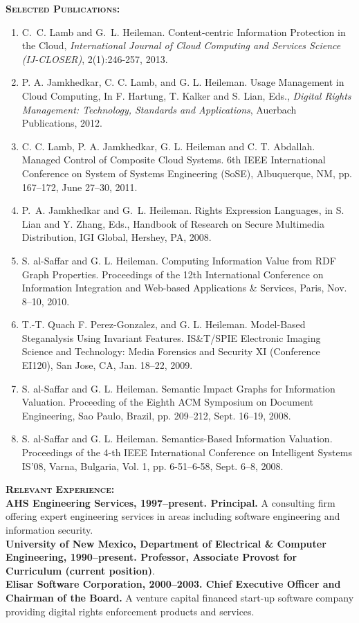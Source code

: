 \documentclass{sbir}
\begin{document}
{{\vspace{-16pt}
\textbf{\textsc{Selected Publications:}}
\vspace{-8pt}
\begin{enumerate}
\item C.~C. Lamb and G.~L. Heileman. Content-centric Information Protection in the Cloud, {\sl International Journal of Cloud Computing and Services Science  (IJ-CLOSER)}, 2(1):246-257, 2013.
\item P. A. Jamkhedkar, C. C. Lamb, and G. L. Heileman. Usage Management in Cloud Computing, In F. Hartung, T. Kalker and S. Lian, Eds., {\sl Digital Rights Management: Technology, Standards and Applications}, Auerbach Publications, 2012. 
\item C. C. Lamb, P. A. Jamkhedkar, G. L. Heileman and C. T. Abdallah. Managed Control of Composite Cloud Systems. 6th IEEE International Conference on System of Systems Engineering (SoSE), Albuquerque, NM, pp. 167--172, June 27--30, 2011.
\item P.~A. Jamkhedkar and G.~L. Heileman. Rights Expression Languages, in S. Lian and Y. Zhang, Eds., {Handbook of Research on Secure Multimedia Distribution}, IGI Global, Hershey, PA, 2008. 
\item S. al-Saffar and G. L. Heileman. Computing Information Value from RDF Graph Properties. Proceedings of the 12th International Conference on Information Integration and Web-based Applications \& Services, Paris, Nov. 8--10, 2010.
\item T.-T. Quach F. Perez-Gonzalez, and G. L. Heileman. Model-Based Steganalysis Using Invariant Features. IS\&T/SPIE Electronic Imaging Science and Technology: Media Forensics and Security XI (Conference EI120), San Jose, CA, Jan. 18--22, 2009.
\item S. al-Saffar and G. L. Heileman. Semantic Impact Graphs for Information Valuation. Proceeding of the Eighth ACM Symposium on Document Engineering, Sao Paulo, Brazil, pp. 209--212, Sept. 16--19, 2008.
\item S. al-Saffar and G. L. Heileman. Semantics-Based Information Valuation. Proceedings of the 4-th IEEE International Conference on Intelligent Systems IS'08, Varna, Bulgaria, Vol. 1, pp. 6-51--6-58, Sept. 6--8, 2008.
\end{enumerate}

\vspace{-6pt}
\textbf{\textsc{Relevant Experience:}}~\\
{\bfseries AHS Engineering Services, 1997--present. Principal.} A consulting firm offering expert engineering services in areas including software engineering and information security.~\\
{\bfseries University of New Mexico, Department of Electrical \& Computer Engineering, 1990--present. Professor, Associate Provost for Curriculum (current position)}.~\\
{\bfseries Elisar Software Corporation, 2000--2003. Chief Executive Officer and Chairman of the Board.} A venture capital financed start-up software company providing digital rights enforcement products and services.

}}
\end{document}
